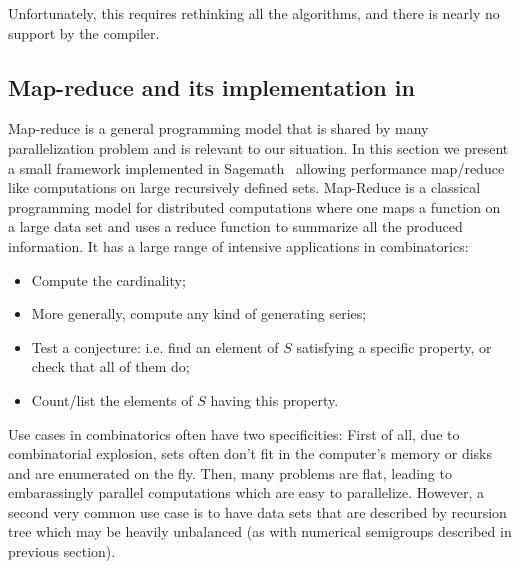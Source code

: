 \documentclass{deliverablereport}
\begin{document}
Unfortunately, this requires rethinking all the algorithms, and there is nearly
no support by the compiler.

\subsection{Map-reduce and its implementation in \Sage}
\label{subsec:map-reduce:Sage}

Map-reduce is a general programming model that is shared by many
parallelization problem and is relevant to our situation. In this section we
present a small framework implemented in Sagemath~\cite{sage} allowing
performance map/reduce like computations on
large recursively defined sets. Map-Reduce is a classical programming model
for distributed computations where one maps a function on a large data set and
uses a reduce function to summarize all the produced information. It has a
large range of intensive applications in combinatorics:
\begin{itemize}
  \item Compute the cardinality;
  \item More generally, compute any kind of generating series;
  \item Test a conjecture: i.e. find an element of $S$ satisfying a specific
    property, or check that all of them do;
  \item Count/list the elements of $S$ having this property.
\end{itemize}
Use cases in combinatorics often have two specificities: First of all, due to
combinatorial explosion, sets often don't fit in the computer's memory or
disks and are enumerated on the fly. Then, many problems are flat, leading to
embarassingly parallel computations which are easy to parallelize. However, a
second very common use case is to have data sets that are described by
recursion tree which may be heavily unbalanced (as with numerical semigroups
described in previous section).
\end{document}
